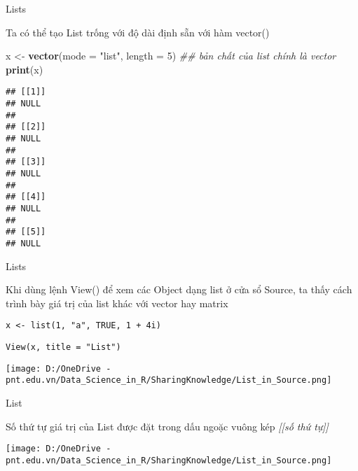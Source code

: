 \documentclass[
  ignorenonframetext,
]{beamer}
\newenvironment{Shaded}{}{}
\newcommand{\CommentTok}[1]{\textcolor[rgb]{0.38,0.63,0.69}{\textit{#1}}}
\newcommand{\DataTypeTok}[1]{\textcolor[rgb]{0.56,0.13,0.00}{#1}}
\newcommand{\DecValTok}[1]{\textcolor[rgb]{0.25,0.63,0.44}{#1}}
\newcommand{\KeywordTok}[1]{\textcolor[rgb]{0.00,0.44,0.13}{\textbf{#1}}}
\newcommand{\NormalTok}[1]{#1}
\newcommand{\StringTok}[1]{\textcolor[rgb]{0.25,0.44,0.63}{#1}}
\begin{document}
\begin{frame}[fragile]{Lists}
\protect\hypertarget{lists-2}{}

Ta có thể tạo List trống với độ dài định sẵn với hàm vector()

\begin{Shaded}
\begin{Highlighting}[]
\NormalTok{x <-}\StringTok{ }\KeywordTok{vector}\NormalTok{(}\DataTypeTok{mode =} \StringTok{"list"}\NormalTok{, }\DataTypeTok{length =} \DecValTok{5}\NormalTok{) }\CommentTok{## bản chất của list chính là vector}
\KeywordTok{print}\NormalTok{(x)}
\end{Highlighting}
\end{Shaded}

\begin{verbatim}
## [[1]]
## NULL
## 
## [[2]]
## NULL
## 
## [[3]]
## NULL
## 
## [[4]]
## NULL
## 
## [[5]]
## NULL
\end{verbatim}

\end{frame}

\begin{frame}[fragile]{Lists}
\protect\hypertarget{lists-3}{}

Khi dùng lệnh View() để xem các Object dạng list ở cửa sổ Source, ta
thấy cách trình bày giá trị của list khác với vector hay matrix

\texttt{x\ \textless{}-\ list(1,\ "a",\ TRUE,\ 1\ +\ 4i)}

\texttt{View(x,\ title\ =\ "List")}

\texttt{[image: D:/OneDrive - pnt.edu.vn/Data\_Science\_in\_R/SharingKnowledge/List\_in\_Source.png]}

\end{frame}

\begin{frame}{List}
\protect\hypertarget{list}{}

Số thứ tự giá trị của List được đặt trong dấu ngoặc vuông kép
\emph{{[}{[}số thứ tự{]}{]}}

\texttt{[image: D:/OneDrive - pnt.edu.vn/Data\_Science\_in\_R/SharingKnowledge/List\_in\_Source.png]}

\end{frame}
\end{document}

